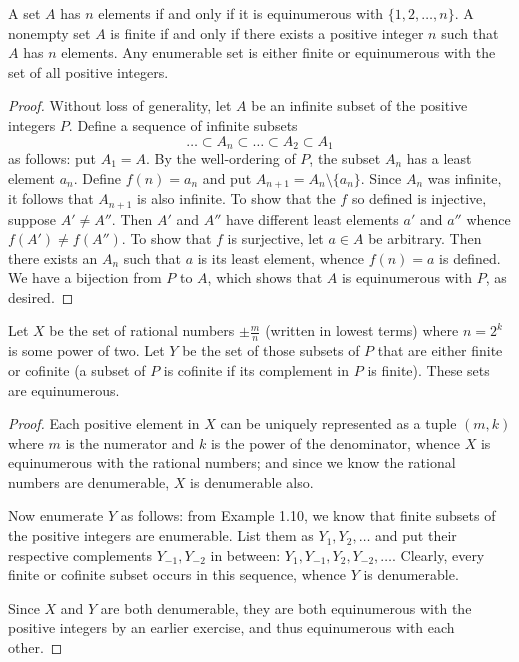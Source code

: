 \begin{exercise}[1.4]
  A set $A$ has $n$ elements if and only if it is equinumerous with $\{1,2,\ldots,n\}$.
  A nonempty set $A$ is finite if and only if there exists a positive integer $n$ such that $A$ has $n$ elements.
  Any enumerable set is either finite or equinumerous with the set of all positive integers.
\end{exercise}
\begin{proof}
  Without loss of generality, let $A$ be an infinite subset of the positive integers $P$.
  Define a sequence of infinite subsets
  \begin{equation*}
    \ldots \subset A_n \subset \ldots \subset A_2 \subset A_1
  \end{equation*}
  as follows: put $A_1 = A$.
  By the well-ordering of $P$, the subset $A_n$ has a least element $a_n$.
  Define $f(n) = a_n$ and put $A_{n+1} = A_n \setminus \{a_n\}$.
  Since $A_n$ was infinite, it follows that $A_{n+1}$ is also infinite.
  To show that the $f$ so defined is injective, suppose $A' \ne A''$.
  Then $A'$ and $A''$ have different least elements $a'$ and $a''$ whence $f(A') \ne f(A'')$.
  To show that $f$ is surjective, let $a \in A$ be arbitrary.
  Then there exists an $A_n$ such that $a$ is its least element, whence $f(n) = a$ is defined.
  We have a bijection from $P$ to $A$, which shows that $A$ is equinumerous with $P$, as desired.
\end{proof}

\begin{exercise}[1.5]
  Let $X$ be the set of rational numbers $\pm\frac{m}{n}$ (written in lowest terms) where $n = 2^k$ is some power of two.
  Let $Y$ be the set of those subsets of $P$ that are either finite or cofinite (a subset of $P$ is cofinite if its complement in $P$ is finite).
  These sets are equinumerous.
\end{exercise}
\begin{proof}
  Each positive element in $X$ can be uniquely represented as a tuple $(m,k)$ where $m$ is the numerator and $k$ is the power of the denominator, whence $X$ is equinumerous with the rational numbers; and since we know the rational numbers are denumerable, $X$ is denumerable also.

  Now enumerate $Y$ as follows: from Example 1.10, we know that finite subsets of the positive integers are enumerable.
  List them as $Y_1,Y_2, \ldots$ and put their respective complements $Y_{-1}, Y_{-2}$ in between: $Y_1, Y_{-1}, Y_2, Y_{-2}, \ldots$.
  Clearly, every finite or cofinite subset occurs in this sequence, whence $Y$ is denumerable.

  Since $X$ and $Y$ are both denumerable, they are both equinumerous with the positive integers by an earlier exercise, and thus equinumerous with each other.
\end{proof}


